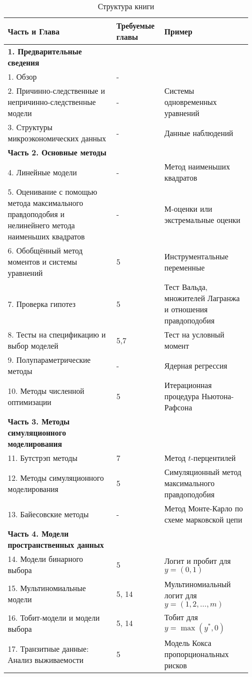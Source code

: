 \begin{table}[h]
\begin{center}
\caption{\label{tab:bookstructure}Структура книги}
\begin{tabular}{p{8cm}p{1cm}p{6cm}}
\hline
\hline
Часть и Глава  & Требуемые главы & Пример \\
\hline
\textbf{1. Предварительные сведения} & & \\
1. Обзор & - & \\
2. Причинно-следственные и непричинно-следственные модели & - & Системы одновременных уравнений \\
3. Структуры микроэкономических данных & - & Данные наблюдений \\
\textbf{Часть 2. Основные методы} & & \\
4. Линейные модели & - & Метод наименьших квадратов \\
5. Оценивание с помощью метода максимального правдоподобия и
нелинейнего метода наименьших квадратов & - & М-оценки или экстремальные оценки \\
6. Обобщённый метод моментов и системы уравнений & 5 & Инструментальные переменные \\
7. Проверка гипотез & 5 & Тест Вальда, множителей Лагранжа и отношения правдоподобия \\
8. Тесты на спецификацию и выбор моделей & 5,7 & Тест на условный момент \\
9. Полупараметрические методы & - & Ядерная регрессия \\
10. Методы численной оптимизации & 5 & Итерационная процедура Ньютона-Рафсона \\
\textbf{Часть 3. Методы симуляционного моделирования} & & \\
11. Бутстрэп методы & 7 & Метод $t$-перцентилей \\
12. Методы симуляционного моделирования & 5 & Симуляционный метод максимального правдоподобия \\
13. Байесовские методы & - & Метод Монте-Карло по схеме марковской цепи \\
\textbf{Часть 4. Модели пространственных данных} & & \\
14. Модели бинарного выбора & 5 & Логит и пробит для $y=(0,1)$ \\
15. Мультиномиальные модели & 5, 14 & Мультиномиальный логит для $y=(1,2,\ldots, m)$ \\
16. Тобит-модели и модели выбора & 5, 14 & Тобит для $y=\max(y^*,0)$ \\
17. Транзитные данные: Анализ выживаемости & 5 & Модель Кокса пропорциональных рисков \\

\end{tabular}
\end{center}
\end{table}
